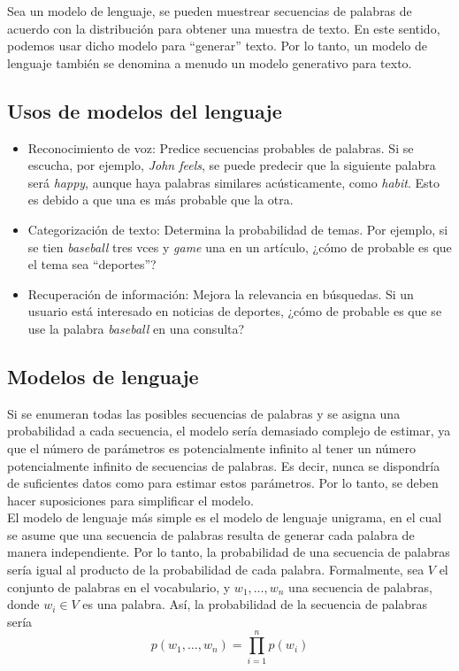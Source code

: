 Sea un modelo de lenguaje, se pueden muestrear secuencias de palabras de acuerdo con la distribución para obtener una muestra de texto. En este sentido, podemos usar dicho modelo para ``generar'' texto. Por lo tanto, un modelo de lenguaje también se denomina a menudo un modelo generativo para texto. 

\subsection{Usos de modelos del lenguaje}

\begin{itemize}
\item Reconocimiento de voz: Predice secuencias probables de palabras. Si se escucha, por ejemplo, \textit{John feels}, se puede predecir que la siguiente palabra será \textit{happy}, aunque haya palabras similares acústicamente, como \textit{habit}. Esto es debido a que una es más probable que la otra. 
\item Categorización de texto: Determina la probabilidad de temas. Por ejemplo, si se tien \textit{baseball} tres vces y \textit{game} una en un artículo, ¿cómo de probable es que el tema sea ``deportes''?
\item Recuperación de información: Mejora la relevancia en búsquedas. Si un usuario está interesado en noticias de deportes, ¿cómo de probable es que se use la palabra \textit{baseball} en una consulta?
\end{itemize}

\subsection{Modelos de lenguaje}

Si se enumeran todas las posibles secuencias de palabras y se asigna una probabilidad a cada secuencia, el modelo sería demasiado complejo de estimar, ya que el número de parámetros es potencialmente infinito al tener un número potencialmente infinito de secuencias de palabras. Es decir, nunca se dispondría de suficientes datos como para estimar estos parámetros. Por lo tanto, se deben hacer suposiciones para simplificar el modelo. \\

El modelo de lenguaje más simple es el modelo de lenguaje unigrama, en el cual se asume que una secuencia de palabras resulta de generar cada palabra de manera independiente. Por lo tanto, la probabilidad de una secuencia de palabras sería igual al producto de la probabilidad de cada palabra. Formalmente, sea $V$ el conjunto de palabras en el vocabulario, y $w_1, \dots, w_n$ una secuencia de palabras, donde $w_i \in V$ es una palabra. Así, la probabilidad de la secuencia de palabras sería
\begin{equation}
p(w_1, \dots, w_n) = \prod_{i=1}^n p(w_i)
\end{equation}

